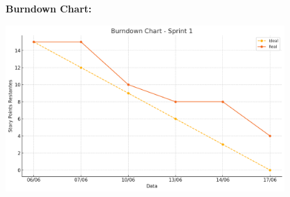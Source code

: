 \vspace{1em}
\noindent\textbf{Burndown Chart:}

\begin{center}
  \includegraphics[width=0.8\textwidth]{pictures/burndown_sprint1.png}
\end{center}